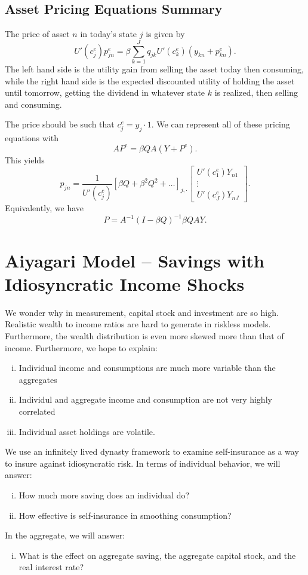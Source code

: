 \documentclass{tufte-handout}
\theoremstyle{definition}
\begin{document}
\subsection{Asset Pricing Equations Summary}
The price of asset $n$ in today's state $j$ is given by \[
	U'(c_j^e)p_{jn}^{e} = \beta \sum\limits_{k=1}^{J} q_{jk} U'(c_k^{e}) \left( y_{kn} + p_{kn}^{e} \right)
.\] The left hand side is the utility gain from selling the asset today then consuming, while the right hand side is the expected discounted utility of holding the asset until tomorrow, getting the dividend in whatever state $k$ is realized, then selling and consuming.

The price should be such that $c_j^e = y_j \cdot 1$.
We can represent all of these pricing equations with \[
	AP^{e} = \beta Q A(Y+P^{e})
.\] This yields \[
	p_{jn} = \frac{1}{U'(c_j^{e})} \left[ \beta Q + \beta^2 Q^2 + \ldots\right]_{j,\cdot} \begin{bmatrix}
		U'(c_1^{e}) Y_{n 1} \\
		\vdots \\
		U'(c_J^{e}) Y_{n J}
	\end{bmatrix} 
.\] Equivalently, we have \[
	P = A^{-1} (I - \beta Q)^{-1} \beta Q A Y
.\] 

\section{Aiyagari Model -- Savings with Idiosyncratic Income Shocks}

We wonder why in measurement, capital stock and investment are so high. Realistic wealth to income ratios are hard to generate in riskless models. Furthermore, the wealth distribution is even more skewed more than that of income. Furthermore, we hope to explain:
\begin{enumerate}[(i)]
	\item Individual income and consumptions are much more variable than the aggregates
	\item Individul and aggregate income and consumption are not very highly correlated
	\item Individual asset holdings are volatile.	
\end{enumerate}

We use an infinitely lived dynasty framework to examine self-insurance as a way to insure against idiosyncratic risk. In terms of individual behavior, we will answer:
\begin{enumerate}[(i)]
	\item How much more saving does an individual do?
	\item How effective is self-insurance in smoothing consumption?
\end{enumerate}
In the aggregate, we will answer:
\begin{enumerate}[(i)]
	\item What is the effect on aggregate saving, the aggregate capital stock, and the real interest rate?
\end{enumerate}
\end{document}

